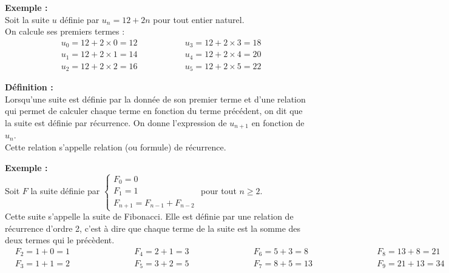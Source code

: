 \documentclass[11pt,a4paper]{article}
\begin{document}
\textbf{Exemple :} ~\\
Soit la suite $u$ définie par $u_n=12+2n$ pour tout entier naturel. \\
On calcule ses premiers termes :
\vspace{-8pt}
\begin{equation*}
  \begin{split}
    &u_0=12+2\times0=12\\
    &u_1=12+2\times1=14\\
    &u_2=12+2\times2=16
  \end{split}
  \qquad\qquad
  \begin{split}
    &u_3=12+2\times3=18\\
    &u_4=12+2\times4=20\\
    &u_5=12+2\times5=22
  \end{split}
\end{equation*}


\begin{mdframed}[style=definitionStyle]
  \textbf{Définition :} ~\\
  Lorsqu'une suite est définie par la donnée de son premier terme et d'une relation qui permet de calculer chaque
  terme en fonction du terme précédent, on dit que la suite est définie par récurrence.
  On donne l'expression de $u_{n+1}$ en fonction de $u_n$. \\ Cette relation s'appelle relation (ou formule) de récurrence.
\end{mdframed}

\textbf{Exemple :} ~\\
Soit $F$ la suite définie par
$\left\{
  \begin{array}{l}
    F_0=0 \\
    F_1=1 \\
    F_{n+1}=F_{n-1}+F_{n-2}
  \end{array}
  \right.$ pour tout $n\geq2$.\\

Cette suite s'appelle la suite de Fibonacci. Elle est définie par une relation de récurrence d'ordre 2, c'est à dire
que chaque terme de la suite est la somme des deux termes qui le précèdent.
\begin{equation*}
  \begin{split}
    &F_2=1+0=1\\
    &F_3=1+1=2
  \end{split}
  \qquad\qquad\qquad
  \begin{split}
    &F_4=2+1=3\\
    &F_5=3+2=5
  \end{split}
  \qquad\qquad\qquad
  \begin{split}
    &F_6=5+3=8\\
    &F_7=8+5=13
  \end{split}
  \qquad\qquad\qquad
  \begin{split}
    &F_8=13+8=21\\
    &F_9=21+13=34
  \end{split}
\end{equation*}
\end{document}
